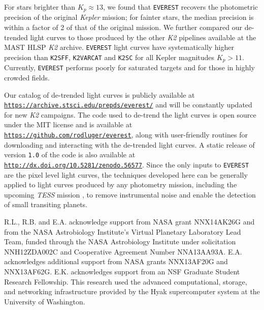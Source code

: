 \documentclass[]{emulateapj}
\begin{document}
For stars brighter than $K_p \approx 13$, we found that \texttt{EVEREST} recovers the 
photometric precision of the original \emph{Kepler} mission; for fainter stars, the 
median precision is within a factor of 2 of that of the original mission.
We further compared our de-trended light curves to those produced by the other \emph{K2} pipelines
available at the MAST HLSP \emph{K2} archive.
\texttt{EVEREST} light curves have systematically higher precision than \texttt{K2SFF},
\texttt{K2VARCAT} and \texttt{K2SC} for all Kepler magnitudes $K_p > 11$. Currently, \texttt{EVEREST}
performs poorly for saturated targets and for those in highly crowded fields.

Our catalog of de-trended light curves is publicly available at 
\texttt{\url{https://archive.stsci.edu/prepds/everest/}} and will be constantly
updated for new \emph{K2} campaigns. The code used to de-trend the light curves
is open source under the MIT license and is available at \texttt{\url{https://github.com/rodluger/everest}},
along with user-friendly routines for downloading and interacting with the de-trended light curves.
A static release of version \texttt{1.0} of the code is also available at 
\texttt{\url{http://dx.doi.org/10.5281/zenodo.56577}}.
Since the only
inputs to \texttt{EVEREST} are the pixel level light curves, the techniques developed
here can be generally applied to light curves produced by any photometry mission,
including the upcoming \emph{TESS} mission \citep{RIC15}, to remove instrumental noise
and enable the detection of small transiting planets.

\begin{acknowledgments}
R.L., R.B. and E.A. acknowledge support from NASA grant NNX14AK26G
and from the NASA Astrobiology
Institute's Virtual Planetary Laboratory Lead Team, funded
through the NASA Astrobiology Institute under solicitation
NNH12ZDA002C and Cooperative Agreement Number
NNA13AA93A. E.A. acknowledges additional support from NASA grants 
NNX13AF20G and NNX13AF62G. E.K. acknowledges support from an NSF 
Graduate Student Research Fellowship.
This research used the advanced computational,
storage, and networking infrastructure provided by the
Hyak supercomputer system at the University of Washington.
\end{acknowledgments}

\vfill

\pagebreak



\end{document}
